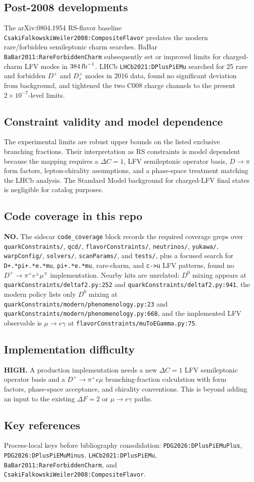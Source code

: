 \subsection*{Post-2008 developments}
The arXiv:0804.1954 RS-flavor baseline
\texttt{CsakiFalkowskiWeiler2008:CompositeFlavor} predates the modern
rare/forbidden semileptonic charm searches.  BaBar
\texttt{BaBar2011:RareForbiddenCharm} subsequently set or improved limits for
charged-charm LFV modes in \(384\,{\rm fb}^{-1}\).  LHCb
\texttt{LHCb2021:DPlusPiEMu} searched for 25 rare and forbidden \(D^+\) and
\(D_s^+\) modes in 2016 data, found no significant deviation from background,
and tightened the two C008 charge channels to the present
\(2\times10^{-7}\)-level limits.

\subsection*{Constraint validity and model dependence}
The experimental limits are robust upper bounds on the listed exclusive
branching fractions.  Their interpretation as RS constraints is model
dependent because the mapping requires a \(\Delta C=1\), LFV semileptonic
operator basis, \(D\to\pi\) form factors, lepton-chirality assumptions, and a
phase-space treatment matching the LHCb analysis.  The Standard Model
background for charged-LFV final states is negligible for catalog purposes.

\subsection*{Code coverage in this repo}
\textbf{NO.}  The sidecar \texttt{code\_coverage} block records the required
coverage greps over \texttt{quarkConstraints/},
\texttt{qcd/}, \texttt{flavorConstraints/}, \texttt{neutrinos/},
\texttt{yukawa/}, \texttt{warpConfig/}, \texttt{solvers/},
\texttt{scanParams/}, and \texttt{tests/}, plus a focused search for
\texttt{D+.*pi+.*e.*mu}, \texttt{pi+.*e.*mu}, rare-charm, and
\texttt{c->u} LFV patterns, found no \(D^+\to\pi^+e^\pm\mu^\mp\)
implementation.  Nearby hits are unrelated: \(D^0\) mixing appears at
\texttt{quarkConstraints/deltaf2.py:252} and
\texttt{quarkConstraints/deltaf2.py:941}, the modern policy lists only
\(D^0\) mixing at \texttt{quarkConstraints/modern/phenomenology.py:23} and
\texttt{quarkConstraints/modern/phenomenology.py:668}, and the implemented
LFV observable is \(\mu\to e\gamma\) at
\texttt{flavorConstraints/muToEGamma.py:75}.

\subsection*{Implementation difficulty}
\textbf{HIGH.}  A production implementation needs a new \(\Delta C=1\)
LFV semileptonic operator basis and a \(D^+\to\pi^+e\mu\) branching-fraction
calculation with form factors, phase-space acceptance, and chirality
conventions.  This is beyond adding an input to the existing \(\Delta F=2\)
or \(\mu\to e\gamma\) paths.

\subsection*{Key references}
Process-local keys before bibliography consolidation:
\texttt{PDG2026:DPlusPiEMuPlus}, \texttt{PDG2026:DPlusPiEMuMinus},
\texttt{LHCb2021:DPlusPiEMu}, \texttt{BaBar2011:RareForbiddenCharm}, and
\texttt{CsakiFalkowskiWeiler2008:CompositeFlavor}.

